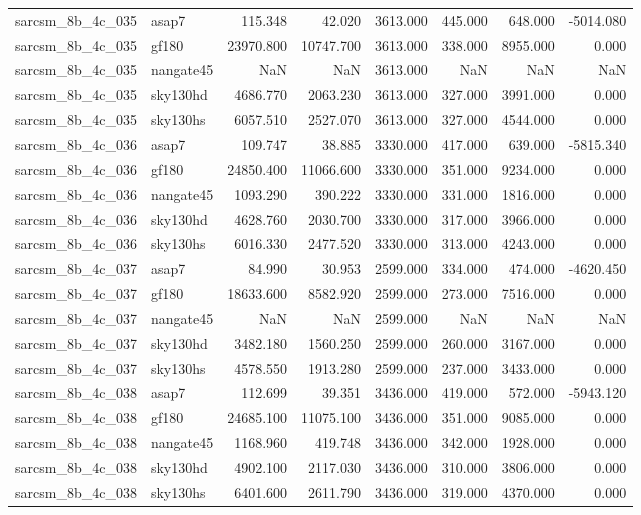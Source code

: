 \begin{tabular}{llrrrrrr}
sarcsm\_8b\_4c\_035 & asap7 & 115.348 & 42.020 & 3613.000 & 445.000 & 648.000 & -5014.080 \\
sarcsm\_8b\_4c\_035 & gf180 & 23970.800 & 10747.700 & 3613.000 & 338.000 & 8955.000 & 0.000 \\
sarcsm\_8b\_4c\_035 & nangate45 & NaN & NaN & 3613.000 & NaN & NaN & NaN \\
sarcsm\_8b\_4c\_035 & sky130hd & 4686.770 & 2063.230 & 3613.000 & 327.000 & 3991.000 & 0.000 \\
sarcsm\_8b\_4c\_035 & sky130hs & 6057.510 & 2527.070 & 3613.000 & 327.000 & 4544.000 & 0.000 \\
sarcsm\_8b\_4c\_036 & asap7 & 109.747 & 38.885 & 3330.000 & 417.000 & 639.000 & -5815.340 \\
sarcsm\_8b\_4c\_036 & gf180 & 24850.400 & 11066.600 & 3330.000 & 351.000 & 9234.000 & 0.000 \\
sarcsm\_8b\_4c\_036 & nangate45 & 1093.290 & 390.222 & 3330.000 & 331.000 & 1816.000 & 0.000 \\
sarcsm\_8b\_4c\_036 & sky130hd & 4628.760 & 2030.700 & 3330.000 & 317.000 & 3966.000 & 0.000 \\
sarcsm\_8b\_4c\_036 & sky130hs & 6016.330 & 2477.520 & 3330.000 & 313.000 & 4243.000 & 0.000 \\
sarcsm\_8b\_4c\_037 & asap7 & 84.990 & 30.953 & 2599.000 & 334.000 & 474.000 & -4620.450 \\
sarcsm\_8b\_4c\_037 & gf180 & 18633.600 & 8582.920 & 2599.000 & 273.000 & 7516.000 & 0.000 \\
sarcsm\_8b\_4c\_037 & nangate45 & NaN & NaN & 2599.000 & NaN & NaN & NaN \\
sarcsm\_8b\_4c\_037 & sky130hd & 3482.180 & 1560.250 & 2599.000 & 260.000 & 3167.000 & 0.000 \\
sarcsm\_8b\_4c\_037 & sky130hs & 4578.550 & 1913.280 & 2599.000 & 237.000 & 3433.000 & 0.000 \\
sarcsm\_8b\_4c\_038 & asap7 & 112.699 & 39.351 & 3436.000 & 419.000 & 572.000 & -5943.120 \\
sarcsm\_8b\_4c\_038 & gf180 & 24685.100 & 11075.100 & 3436.000 & 351.000 & 9085.000 & 0.000 \\
sarcsm\_8b\_4c\_038 & nangate45 & 1168.960 & 419.748 & 3436.000 & 342.000 & 1928.000 & 0.000 \\
sarcsm\_8b\_4c\_038 & sky130hd & 4902.100 & 2117.030 & 3436.000 & 310.000 & 3806.000 & 0.000 \\
sarcsm\_8b\_4c\_038 & sky130hs & 6401.600 & 2611.790 & 3436.000 & 319.000 & 4370.000 & 0.000 \\

\end{tabular}

